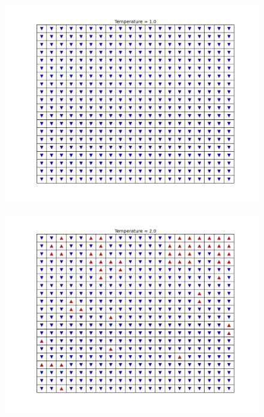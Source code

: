 \documentclass[a4paper,12pt]{article}
\begin{document}
\begin{figure}[H]
\centering
\includegraphics[width = \linewidth]{lab11q2.png}
\caption{}
\label{fig:q2}
\end{figure}

\begin{figure}[H]
\centering
\includegraphics[width = \linewidth]{lab11q2_2.png}
\caption{}
\label{fig:q2_2}
\end{figure}
\end{document}
